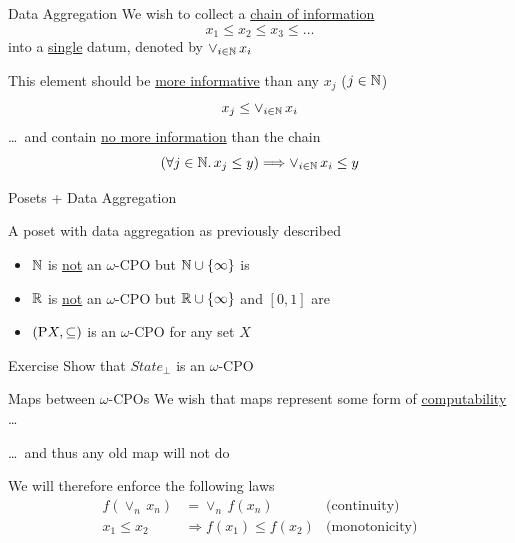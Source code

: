 \documentclass{beamer}
\begin{document}
\begin{frame}{Data Aggregation}
        We wish to collect a \alert{\underline{chain of information}}
        \[
                x_1 \leq x_2 \leq x_3 \leq \dots
        \]
        into a \alert{\underline{single}} datum, denoted by $\vee_{i \in \mathbb{N}}\, x_i$

        \pause
        \bigskip
        This element should be \alert{\underline{more informative}}
        than any $x_j$ ($j \in \mathbb{N}$) \ie\
        \[
                x_j \leq \vee_{i \in \mathbb{N}}\, x_i
        \]
        \dots\ and contain \alert{\underline{no more information}} than the chain
        \ie\
        \[
                (\forall j \in \mathbb{N}. \, x_j \leq y) \Longrightarrow
                \vee_{i \in \mathbb{N}}\, x_i \leq y
        \]
\end{frame}

\begin{frame}{Posets + Data Aggregation}

        \begin{definition}
                A poset with data aggregation as previously described
        \end{definition}

        \begin{examples}
                \begin{itemize}
                        \item $\mathbb{N}$ is \underline{not} an $\omega$-CPO but
                                $\mathbb{N} \cup \{ \infty \}$ is
                        \item $\mathbb{R}$ is \underline{not} an $\omega$-CPO but
                                $\mathbb{R} \cup \{ \infty \}$ and $[0,1]$ are
                        \item $(\mathrm{P} X, \subseteq)$ is an $\omega$-CPO for any set $X$
                \end{itemize}
        \end{examples}

        \pause
        \bigskip
        \begin{block}{Exercise}
                Show that $State_\bot$ is an $\omega$-CPO
        \end{block}
\end{frame}

\begin{frame}{Maps between $\omega$-CPOs}
        We wish that maps represent some form of
        \alert{\underline{computability}} \dots

        \dots\ and thus any old map will not do

        \pause
        \bigskip
        We will therefore enforce the following laws
        \begin{align*}
                f(\vee_n\, x_n) & = \vee_{n}\, f(x_n) & \text{(continuity)}
                \\
                x_1 \leq x_2 & \Rightarrow f(x_1) \leq f(x_2) & \text{(monotonicity)}
        \end{align*}
\end{frame}
\end{document}
